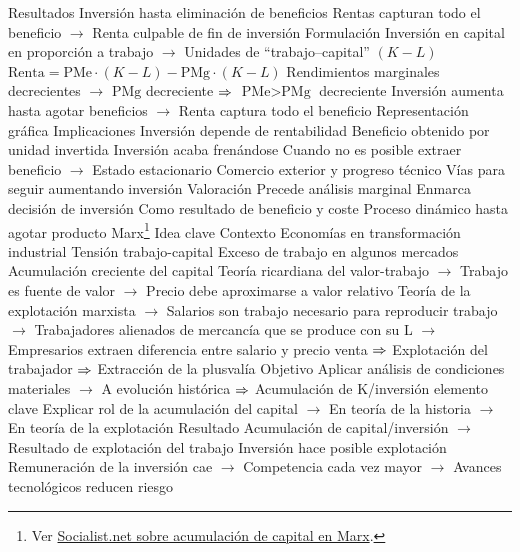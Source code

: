 \documentclass{nuevotema}
\begin{document}
\begin{esquemal}
				\4 Resultados
				\4[] Inversión hasta eliminación de beneficios
				\4[] Rentas capturan todo el beneficio
				\4[] $\to$ Renta culpable de fin de inversión
			\3 Formulación
				\4 Inversión en capital en proporción a trabajo
				\4[] $\to$ Unidades de ``trabajo--capital'' $(K-L)$
				\4 $\text{Renta} = \text{PMe} \cdot (K-L) - \text{PMg} \cdot (K-L)$
				\4 Rendimientos marginales decrecientes
				\4[] $\to$ $\text{PMg}$ decreciente
				\4[] $\Rightarrow$ $\text{PMe} > \text{PMg}$ decreciente
				\4 Inversión aumenta hasta agotar beneficios
				\4[] $\to$ Renta captura todo el beneficio
				\4 Representación gráfica
				\4[] 
			\3 Implicaciones
				\4 Inversión depende de rentabilidad
				\4[] Beneficio obtenido por unidad invertida
				\4 Inversión acaba frenándose
				\4[] Cuando no es posible extraer beneficio
				\4[] $\to$ Estado estacionario
				\4 Comercio exterior y progreso técnico
				\4[] Vías para seguir aumentando inversión
			\3 Valoración
				\4 Precede análisis marginal
				\4 Enmarca decisión de inversión
				\4[] Como resultado de beneficio y coste
				\4[] Proceso dinámico hasta agotar producto
		\2 Marx\footnote{Ver \href{https://www.socialist.net/marx-s-capital-chapters-23-25-accumulation.htm}{Socialist.net sobre acumulación de capital en Marx}.}
			\3 Idea clave
				\4 Contexto
				\4[] Economías en transformación industrial
				\4[] Tensión trabajo-capital
				\4[] Exceso de trabajo en algunos mercados
				\4[] Acumulación creciente del capital
				\4[] Teoría ricardiana del valor-trabajo
				\4[] $\to$ Trabajo es fuente de valor
				\4[] $\to$ Precio debe aproximarse a valor relativo
				\4[] Teoría de la explotación marxista
				\4[] $\to$ Salarios son trabajo necesario para reproducir trabajo
				\4[] $\to$ Trabajadores alienados de mercancía que se produce con su L
				\4[] $\to$ Empresarios extraen diferencia entre salario y precio venta
				\4[] $\Rightarrow$ Explotación del trabajador
				\4[] $\Rightarrow$ Extracción de la plusvalía
				\4[]
				\4 Objetivo
				\4[] Aplicar análisis de condiciones materiales
				\4[] $\to$ A evolución histórica
				\4[] $\Rightarrow$ Acumulación de K/inversión elemento clave
				\4[] Explicar rol de la acumulación del capital
				\4[] $\to$ En teoría de la historia
				\4[] $\to$ En teoría de la explotación
				\4 Resultado
				\4[] Acumulación de capital/inversión
				\4[] $\to$ Resultado de explotación del trabajo
				\4[] Inversión hace posible explotación
				\4[] Remuneración de la inversión cae
				\4[] $\to$ Competencia cada vez mayor
				\4[] $\to$ Avances tecnológicos reducen riesgo

\end{esquemal}
\end{document}
